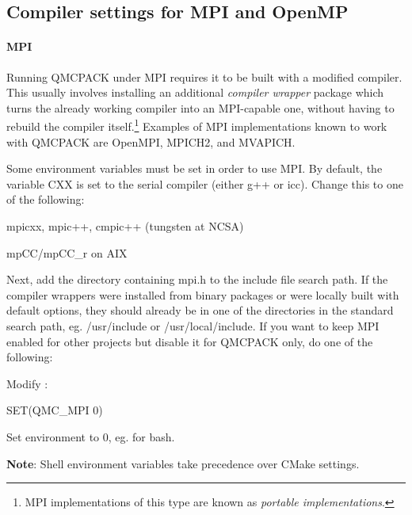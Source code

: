\subsection{Compiler settings for MPI and OpenMP} \label{ss:compset}
\paragraph{MPI}
Running QMCPACK under MPI requires it to be built with a modified compiler.  This usually involves installing an additional \emph{compiler wrapper} package which turns the already working compiler into an MPI-capable one, without having to rebuild the compiler itself.\footnote{MPI implementations of this type are known as \emph{portable implementations}.}  Examples of MPI implementations known to work with QMCPACK are OpenMPI, MPICH2, and MVAPICH.

Some environment variables must be set in order to use MPI.  By default, the variable CXX is set to the serial compiler (either g++ or icc).  Change this to one of the following:
\begin{itemize*}
  \item{} mpicxx, mpic++, cmpic++ (tungsten at NCSA)
  \item{} mpCC/mpCC\_r on AIX 
\end{itemize*}
Next, add the directory containing mpi.h to the include file search path.  If the compiler wrappers were installed from binary packages or were locally built with default options, they should already be in one of the directories in the standard search path, eg. /usr/include or /usr/local/include.  If you want to keep MPI enabled for other projects but disable it for QMCPACK only, do one of the following:
\begin{itemize*}
  \item{} Modify :
\begin{code}
SET(QMC_MPI 0)
\end{code}
  \item{} Set  environment to 0, eg.  for bash.
\end{itemize*}
\textbf{Note}: Shell environment variables take precedence over CMake settings.

